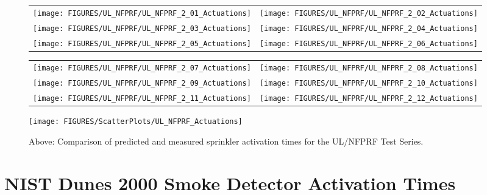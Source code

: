 \begin{figure}[p]
\begin{tabular*}{\textwidth}{l@{\extracolsep{\fill}}r}
\texttt{[image: FIGURES/UL\_NFPRF/UL\_NFPRF\_2\_01\_Actuations]} &
\texttt{[image: FIGURES/UL\_NFPRF/UL\_NFPRF\_2\_02\_Actuations]} \\
\texttt{[image: FIGURES/UL\_NFPRF/UL\_NFPRF\_2\_03\_Actuations]} &
\texttt{[image: FIGURES/UL\_NFPRF/UL\_NFPRF\_2\_04\_Actuations]} \\
\texttt{[image: FIGURES/UL\_NFPRF/UL\_NFPRF\_2\_05\_Actuations]} &
\texttt{[image: FIGURES/UL\_NFPRF/UL\_NFPRF\_2\_06\_Actuations]}
\end{tabular*}
\label{UL_NFPRF_2_1}
\end{figure}

\begin{figure}[p]
\begin{tabular*}{\textwidth}{l@{\extracolsep{\fill}}r}
\texttt{[image: FIGURES/UL\_NFPRF/UL\_NFPRF\_2\_07\_Actuations]} &
\texttt{[image: FIGURES/UL\_NFPRF/UL\_NFPRF\_2\_08\_Actuations]} \\
\texttt{[image: FIGURES/UL\_NFPRF/UL\_NFPRF\_2\_09\_Actuations]} &
\texttt{[image: FIGURES/UL\_NFPRF/UL\_NFPRF\_2\_10\_Actuations]} \\
\texttt{[image: FIGURES/UL\_NFPRF/UL\_NFPRF\_2\_11\_Actuations]} &
\texttt{[image: FIGURES/UL\_NFPRF/UL\_NFPRF\_2\_12\_Actuations]}
\end{tabular*}
\label{UL_NFPRF_2_2}
\end{figure}

\begin{figure}[p]
\begin{center}
\texttt{[image: FIGURES/ScatterPlots/UL\_NFPRF\_Actuations]}
\end{center}
\caption[Summary of sprinkler actuation predictions, UL/NFPRF Tests]
{Above: Comparison of predicted and measured sprinkler activation times for the UL/NFPRF Test Series.}
\label{UL_NFPRF}
\end{figure}







\clearpage

\section{NIST Dunes 2000 Smoke Detector Activation Times}
\label{NIST_Dunes_2000_Smoke}

